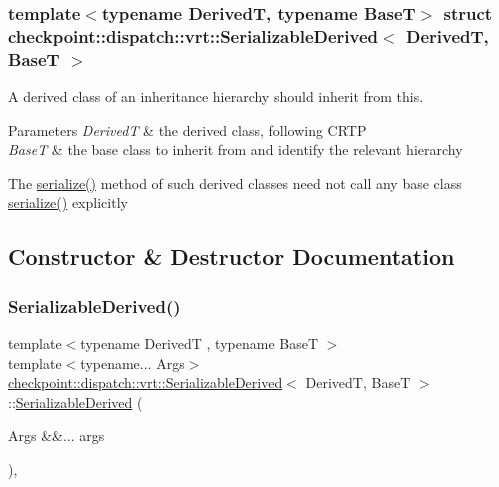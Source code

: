 \subsubsection*{template$<$typename DerivedT, typename BaseT$>$\newline
struct checkpoint\+::dispatch\+::vrt\+::\+Serializable\+Derived$<$ Derived\+T, Base\+T $>$}

A derived class of an inheritance hierarchy should inherit from this. 


\begin{DoxyParams}{Parameters}
{\em DerivedT} & the derived class, following C\+R\+TP \\
\hline
{\em BaseT} & the base class to inherit from and identify the relevant hierarchy\\
\hline
\end{DoxyParams}
The \hyperlink{namespacecheckpoint_a075da4e7344cf037943362517e606c3a}{serialize()} method of such derived classes need not call any base class \hyperlink{namespacecheckpoint_a075da4e7344cf037943362517e606c3a}{serialize()} explicitly 

\subsection{Constructor \& Destructor Documentation}
\mbox{\label{structcheckpoint_1_1dispatch_1_1vrt_1_1_serializable_derived_ac9c3d3e0146ad0b29300c0849b127f1f}} 
\subsubsection{\texorpdfstring{Serializable\+Derived()}{SerializableDerived()}\hspace{0.1cm}{\footnotesize\ttfamily [1/2]}}
{\footnotesize\ttfamily template$<$typename DerivedT , typename BaseT $>$ \\
template$<$typename... Args$>$ \\
\hyperlink{structcheckpoint_1_1dispatch_1_1vrt_1_1_serializable_derived}{checkpoint\+::dispatch\+::vrt\+::\+Serializable\+Derived}$<$ DerivedT, BaseT $>$\+::\hyperlink{structcheckpoint_1_1dispatch_1_1vrt_1_1_serializable_derived}{Serializable\+Derived} (\begin{DoxyParamCaption}\item[{Args \&\&...}]{args }\end{DoxyParamCaption})\hspace{0.3cm}{\ttfamily [inline]}, {\ttfamily [explicit]}}


